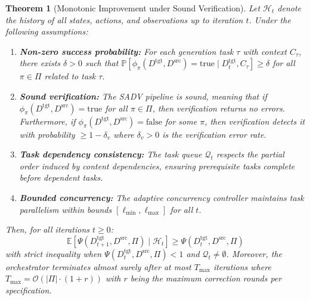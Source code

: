 \documentclass{ieeeaccess}
\newtheorem{theorem}{Theorem}
\begin{document}
\begin{theorem}[Monotonic Improvement under Sound Verification]
\label{thm:convergence}
Let \(\mathcal{H}_t\) denote the history of all states, actions, and observations up to iteration \(t\). Under the following assumptions:
\begin{enumerate}
\item \textbf{Non-zero success probability:} For each generation task \(\tau\) with context \(C_\tau\), there exists \(\delta > 0\) such that \(\mathbb{P}[\phi_{\pi}(D^{\text{tgt}}, D^{\text{src}}) = \text{true} \mid D^{\text{tgt}}_t, C_\tau] \geq \delta\) for all \(\pi \in \Pi\) related to task \(\tau\).
\item \textbf{Sound verification:} The SADV pipeline is sound, meaning that if \(\phi_{\pi}(D^{\text{tgt}}, D^{\text{src}}) = \text{true}\) for all \(\pi \in \Pi\), then verification returns no errors. Furthermore, if \(\phi_{\pi}(D^{\text{tgt}}, D^{\text{src}}) = \text{false}\) for some \(\pi\), then verification detects it with probability \(\geq 1 - \delta_v\) where \(\delta_v > 0\) is the verification error rate.
\item \textbf{Task dependency consistency:} The task queue \(\mathcal{Q}_t\) respects the partial order induced by content dependencies, ensuring prerequisite tasks complete before dependent tasks.
\item \textbf{Bounded concurrency:} The adaptive concurrency controller maintains task parallelism within bounds \([\ell_{\min}, \ell_{\max}]\) for all \(t\).
\end{enumerate}

Then, for all iterations \(t \geq 0\):
\begin{equation}
\mathbb{E}[\Psi(D^{\text{tgt}}_{t+1}, D^{\text{src}}, \Pi) \mid \mathcal{H}_t] \geq \Psi(D^{\text{tgt}}_t, D^{\text{src}}, \Pi)
\label{eq:monotone}
\end{equation}
with strict inequality when \(\Psi(D^{\text{tgt}}_t, D^{\text{src}}, \Pi) < 1\) and \(\mathcal{Q}_t \neq \emptyset\). Moreover, the orchestrator terminates almost surely after at most \(T_{\max}\) iterations where \(T_{\max} = \mathcal{O}(|\Pi| \cdot (1 + r))\) with \(r\) being the maximum correction rounds per specification.
\end{theorem}
\end{document}
